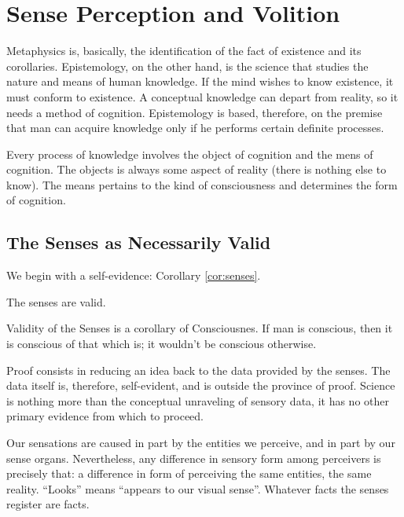 \chapter{Sense Perception and Volition}
\label{cha:sense_perception}

    Metaphysics is, basically, the identification of the fact of existence and its corollaries. Epistemology, on the other hand, is the science that studies the nature and means of human knowledge. If the mind wishes to know existence, it must conform to existence. A conceptual knowledge can depart from reality, so it needs a method of cognition. Epistemology is based, therefore, on the premise that man can acquire knowledge only if he performs certain definite processes.

    Every process of knowledge involves the object of cognition and the mens of cognition. The objects is always some aspect of reality (there is nothing else to know). The means pertains to the kind of consciousness and determines the form of cognition.
    
    \section{The Senses as Necessarily Valid}
    
        We begin with a self-evidence: Corollary \ref{cor:senses}.

            \begin{corollary}
            \label{cor:senses}
                The senses are valid.
            \end{corollary}

            \begin{remark}
                Validity of the Senses is a corollary of Consciousnes. If man is conscious, then it is conscious of that which is; it wouldn't be conscious otherwise.
            \end{remark}
        
        Proof consists in reducing an idea back to the data provided by the senses. The data itself is, therefore, self-evident, and is outside the province of proof. Science is nothing more than the conceptual unraveling of sensory data, it has no other primary evidence from which to proceed.
        
        Our sensations are caused in part by the entities we perceive, and in part by our sense organs. Nevertheless, any difference in sensory form among perceivers is precisely that: a difference in form of perceiving the same entities, the same reality. ``Looks'' means ``appears to our visual sense''. Whatever facts the senses register are facts.
    

